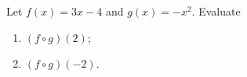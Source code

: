 Let $f(x)=3x-4$ and $g(x)=-x^2$. Evaluate
\begin{enumerate}
\item[(a)] $(f\circ g)(2)$;
\item[(b)] $(f\circ g)(-2)$.
\end{enumerate}
